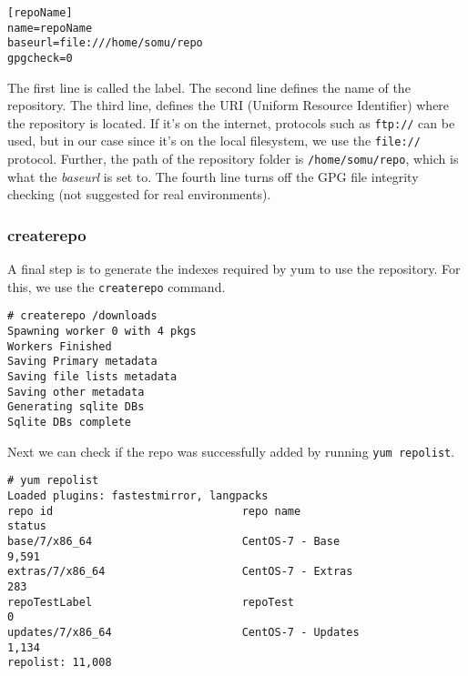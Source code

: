 \vspace{-15pt}
\begin{verbatim}
[repoName]
name=repoName
baseurl=file:///home/somu/repo
gpgcheck=0
\end{verbatim}
\vspace{-10pt}

\noindent
The first line is called the label. The second line defines the name of the repository. The third line, defines the URI (Uniform Resource Identifier) where the repository is located. If it's on the internet, protocols such as \verb|ftp://| can be used, but in our case since it's on the local filesystem, we use the \verb|file://| protocol. Further, the path of the repository folder is \verb|/home/somu/repo|, which is what the \textit{baseurl} is set to. The fourth line turns off the GPG file integrity checking (not suggested for real environments). 

\subsubsection{createrepo}
A final step is to generate the indexes required by yum to use the repository. For this, we use the \verb|createrepo| command. 

\vspace{-15pt}
\begin{verbatim}
# createrepo /downloads
Spawning worker 0 with 4 pkgs
Workers Finished
Saving Primary metadata
Saving file lists metadata
Saving other metadata
Generating sqlite DBs
Sqlite DBs complete
\end{verbatim}
\vspace{-10pt}

Next we can check if the repo was successfully added by running \verb|yum repolist|.

\vspace{-15pt}
\begin{verbatim}
# yum repolist
Loaded plugins: fastestmirror, langpacks
repo id                             repo name                             status
base/7/x86_64                       CentOS-7 - Base                       9,591
extras/7/x86_64                     CentOS-7 - Extras                       283
repoTestLabel                       repoTest                                  0
updates/7/x86_64                    CentOS-7 - Updates                    1,134
repolist: 11,008
\end{verbatim}
\vspace{-10pt}

